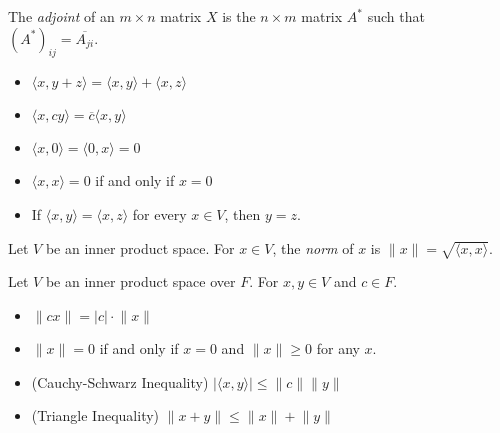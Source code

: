 \documentclass[12pt]{article}
\newenvironment{theorem}[2][Theorem]{\begin{trivlist}
\item[\hskip \labelsep {\bfseries #1}\hskip \labelsep {\bfseries #2.}]}{\end{trivlist}}
\newenvironment{definition}[2][Definition]{\begin{trivlist}
\item[\hskip \labelsep {\bfseries #1}\hskip \labelsep {\bfseries #2}]}{\end{trivlist}}
\begin{document}
\begin{definition}{2}
The \textit{adjoint} of an $m \times n$ matrix $X$ is the $n \times m$ matrix $A^*$ such that $(A^*)_{ij} = \overline{A_{ji}}$.
\end{definition}

\begin{theorem}{6.1} \text{ }
\begin{itemize}
    \item $\langle x, y + z \rangle = \langle x, y \rangle + \langle x, z \rangle$
    
    \item $\langle x, cy \rangle = \overline{c}\langle x, y \rangle$
    
    \item $\langle x, 0 \rangle = \langle 0, x \rangle = 0$
    
    \item $\langle x, x \rangle = 0$ if and only if $x = 0$
    
    \item If $\langle x, y \rangle = \langle x, z \rangle$ for every $x \in V$, then $y = z$.
\end{itemize}
\end{theorem}

\begin{definition}{3}
Let $V$ be an inner product space. For $x \in V$, the \textit{norm} of $x$ is $\lVert x \rVert = \sqrt{\langle x, x \rangle}$.
\end{definition}

\begin{theorem}{6.2}
Let $V$ be an inner product space over $F$. For $x,y \in V$ and $c \in F$.

\begin{itemize}
    \item[(a)] $\lVert cx \rVert = |c| \cdot \lVert x \rVert$
    
    \item[(b)] $\lVert x \rVert = 0$ if and only if $x = 0$ and $\lVert x \rVert \geq 0$ for any $x$.
    
    \item[(c)] (Cauchy-Schwarz Inequality) $\lvert \langle x, y \rangle \rvert \leq \lVert c \rVert \lVert y \rVert$
    
    \item[(d)] (Triangle Inequality) $\lVert x + y \rVert \leq \lVert x \rVert + \lVert y \rVert$
\end{itemize}
\end{theorem}
\end{document}
